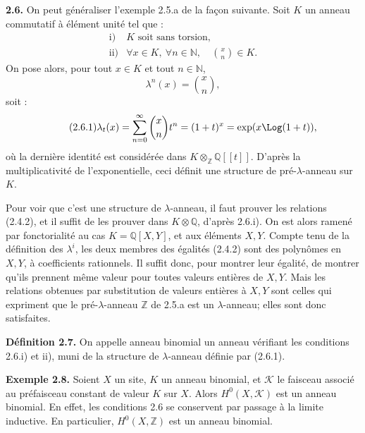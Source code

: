 \documentclass[11pt]{article}
\begin{document}
\textbf{2.6.} On peut généraliser l'exemple 2.5.a de la façon suivante. Soit \(K\) un anneau commutatif à élément unité tel que :
\[
\begin{array}{ll}
\text{i)}& K\text{ soit sans torsion},\\
\text{ii)}& \forall x\in K,\ \forall n\in\mathbb N,\quad \binom{x}{n}\in K.
\end{array}
\]
On pose alors, pour tout \(x\in K\) et tout \(n\in\mathbb N\),
\[
  \lambda^n(x)=\binom{x}{n},
\]
soit :
\begin{equation}\tag{2.6.1}
  \lambda_t(x)=\sum_{n=0}^{\infty}\binom{x}{n}t^n
  =(1+t)^x=\exp(x\Log(1+t)),
\end{equation}
où la dernière identité est considérée dans \(K\otimes_{\mathbb Z}\mathbb Q[[t]]\). D'après la multiplicativité de l'exponentielle, ceci définit une structure de pré-\(\lambda\)-anneau sur \(K\).

Pour voir que c'est une structure de \(\lambda\)-anneau, il faut prouver les relations (2.4.2), et il suffit de les prouver dans \(K\otimes\mathbb Q\), d'après 2.6.i). On est alors ramené par fonctorialité au cas \(K=\mathbb Q[X,Y]\), et aux éléments \(X,Y\). Compte tenu de la définition des \(\lambda^i\), les deux membres des égalités (2.4.2) sont des polynômes en \(X,Y\), à coefficients rationnels. Il suffit donc, pour montrer leur égalité, de montrer qu'ils prennent même valeur pour toutes valeurs entières de \(X,Y\). Mais les relations obtenues par substitution de valeurs entières à \(X,Y\) sont celles qui expriment que le pré-\(\lambda\)-anneau \(\mathbb Z\) de 2.5.a est un \(\lambda\)-anneau; elles sont donc satisfaites.

\textbf{Définition 2.7.} On appelle anneau binomial un anneau vérifiant les conditions 2.6.i) et ii), muni de la structure de \(\lambda\)-anneau définie par (2.6.1).

\textbf{Exemple 2.8.} Soient \(X\) un site, \(K\) un anneau binomial, et \(\mathcal K\) le faisceau associé au préfaisceau constant de valeur \(K\) sur \(X\). Alors \(H^0(X,\mathcal K)\) est un anneau binomial. En effet, les conditions 2.6 se conservent par passage à la limite inductive. En particulier, \(H^0(X,\mathbb Z)\) est un anneau binomial.
\end{document}
